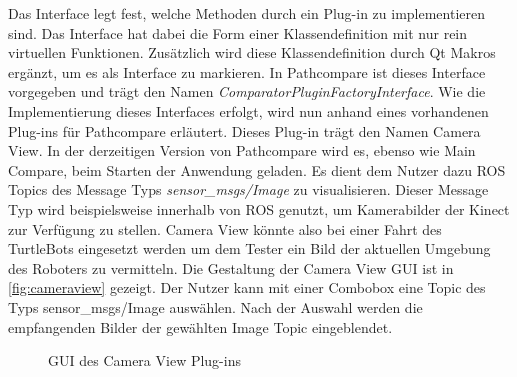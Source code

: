 Das Interface legt fest, welche
Methoden durch ein Plug-in zu implementieren sind. Das Interface hat dabei die
Form einer Klassendefinition mit nur rein virtuellen Funktionen. Zusätzlich
wird diese Klassendefinition durch Qt Makros ergänzt, um es als Interface zu
markieren. In Pathcompare ist dieses Interface vorgegeben und trägt den Namen
\textit{ComparatorPluginFactoryInterface}. Wie die Implementierung dieses
Interfaces erfolgt, wird nun anhand eines vorhandenen Plug-ins für Pathcompare
erläutert. Dieses Plug-in trägt den Namen Camera View. In der derzeitigen
Version von Pathcompare wird es, ebenso wie Main Compare, beim Starten der
Anwendung geladen. Es dient dem Nutzer dazu ROS Topics des Message Typs
\textit{sensor\_msgs/Image} zu visualisieren. Dieser Message Typ wird
beispielsweise innerhalb von ROS genutzt, um Kamerabilder der Kinect zur
Verfügung zu stellen.  Camera View könnte also bei einer Fahrt des TurtleBots
eingesetzt werden um dem Tester ein Bild der aktuellen Umgebung des Roboters zu
vermitteln. Die Gestaltung der Camera View GUI ist in \autoref{fig:cameraview}
gezeigt.  Der Nutzer kann mit einer Combobox eine Topic des Typs
sensor\_msgs/Image auswählen. Nach der Auswahl werden die empfangenden Bilder
der gewählten Image Topic eingeblendet. 

\begin{figure}[t]
  \begin{center}
  \end{center}
  \caption{GUI des Camera View Plug-ins}
  \label{fig:cameraview}
\end{figure}

